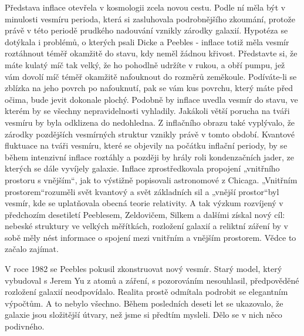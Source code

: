   Představa inflace otevřela v kosmologii zcela novou cestu. Podle ní měla být v minulosti vesmíru
  perioda, která si zasluhovala podrobnějšího zkoumání, protože právě v této periodě prudkého
  nadouvání vznikly zárodky galaxií. Hypotéza se dotýkala i problémů, o kterých psali Dicke a
  Peebles - inflace totiž měla vesmír roztáhnout téměř okamžitě do stavu, kdy neměl žádnou křivost.
  Představte si, že máte kulatý míč tak velký, že ho pohodlně udržíte v rukou, a obří pumpu, jež vám
  dovolí míč téměř okamžitě nafouknout do rozměrů zeměkoule. Podíváte-li se zblízka na jeho povrch
  po nafouknutí, pak se vám kus povrchu, který máte před očima, bude jevit dokonale plochý. Podobně
  by inflace uvedla vesmír do stavu, ve kterém by se všechny nepravidelnosti vyhladily. Jakákoli
  větší porucha na tváři vesmíru by byla odklizena do nedohledna. Z inflačního obrazu také
  vyplývalo, že zárodky pozdějších vesmírných struktur vznikly právě v tomto období. Kvantové
  fluktuace na tváři vesmíru, které se objevily na počátku inflační periody, by se během intenzivní
  inflace roztáhly a později by hrály roli kondenzačních jader, ze kterých se dále vyvíjely galaxie.
  Inflace zprostředkovala propojení „vnitřního prostoru s vnějším“, jak to výstižně popisovali
  astronomové z Chicaga. „Vnitřním prostorem“rozuměli svět kvantový a svět základních sil a „vnější
  prostor“byl vesmír, kde se uplatňovala obecná teorie relativity. A tak výzkum rozvíjený v
  předchozím desetiletí Peeblesem, Zeldovičem, Silkem a dalšími získal nový cíl: nebeské struktury
  ve velkých měřítkách, rozložení galaxií a reliktní záření by v sobě měly nést informace o spojení
  mezi vnitřním a vnějším prostorem. Vědce to začalo zajímat. 
  
  V roce 1982 se Peebles pokusil zkonstruovat nový vesmír. Starý model, který vybudoval s Jerem Yu z
  atomů a záření, s pozorováním nesouhlasil, předpověděné rozložení galaxií neodpovídalo. Realita
  prostě odmítala podrobit se elegantním výpočtům. A to nebylo všechno. Během posledních deseti let
  se ukazovalo, že galaxie jsou složitější útvary, než jsme si předtím mysleli. Dělo se v nich něco
  podivného. 
  
